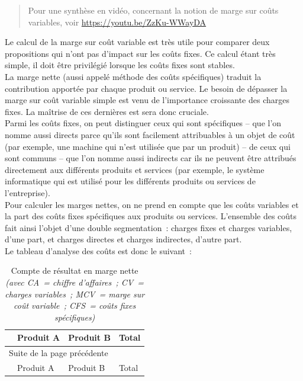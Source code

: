 \documentclass{tufte-handout}
\begin{document}
\begin{enumerate}
\begin{quote}
Pour une synthèse en vidéo, concernant la notion de marge sur coûts variables, voir \url{https://youtu.be/ZzKu-WWayDA}\\
\end{quote}

Le calcul de la marge sur coût variable est très utile pour comparer deux propositions qui n'ont pas d'impact sur les coûts fixes. Ce calcul étant très simple, il doit être privilégié lorsque les coûts fixes sont stables.\\

La marge nette (aussi appelé méthode des coûts spécifiques) traduit la contribution apportée par chaque produit ou service. Le besoin de dépasser la marge sur coût variable simple est venu de l'importance croissante des charges fixes. La maîtrise de ces dernières est sera donc cruciale.\\

Parmi les coûts fixes, on peut distinguer ceux qui sont spécifiques – que l'on nomme aussi directs parce qu'ils sont facilement attribuables à un objet de coût (par exemple, une machine qui n'est utilisée que par un produit) – de ceux qui sont communs – que l'on nomme aussi indirects car ils ne peuvent être attribués directement aux différents produits et services (par exemple, le système informatique qui est utilisé pour les différents produits ou services de l'entreprise).\\

Pour calculer les marges nettes, on ne prend en compte que les coûts variables et la part des coûts fixes spécifiques aux produits ou services. L'ensemble des coûts fait ainsi l'objet d'une double segmentation : charges fixes et charges variables, d'une part, et charges directes et charges indirectes, d'autre part.\\

Le tableau d'analyse des coûts est donc le suivant :\\

\begin{longtable}{llll}
\caption{Compte de résultat en marge nette \emph{(avec CA = chiffre d'affaires ; CV = charges variables ; MCV = marge sur coût variable ; CFS = coûts fixes spécifiques)}}
\\
 & Produit A & Produit B & Total\\
\hline
\endfirsthead
\multicolumn{4}{l}{Suite de la page précédente} \\
\hline

 & Produit A & Produit B & Total \\


\end{longtable}
\end{enumerate}
\end{document}
